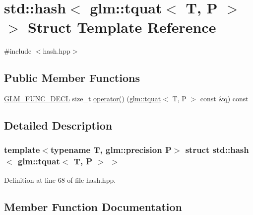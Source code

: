 \hypertarget{structstd_1_1hash_3_01glm_1_1tquat_3_01_t_00_01_p_01_4_01_4}{}\section{std\+::hash$<$ glm\+::tquat$<$ T, P $>$ $>$ Struct Template Reference}
\label{structstd_1_1hash_3_01glm_1_1tquat_3_01_t_00_01_p_01_4_01_4}


{\ttfamily \#include $<$hash.\+hpp$>$}

\subsection*{Public Member Functions}
\begin{DoxyCompactItemize}
\item 
\mbox{\hyperlink{setup_8hpp_ab2d052de21a70539923e9bcbf6e83a51}{G\+L\+M\+\_\+\+F\+U\+N\+C\+\_\+\+D\+E\+CL}} size\+\_\+t \mbox{\hyperlink{structstd_1_1hash_3_01glm_1_1tquat_3_01_t_00_01_p_01_4_01_4_a0a100f21a2aa8516ecff4f4576f7ebab}{operator()}} (\mbox{\hyperlink{structglm_1_1tquat}{glm\+::tquat}}$<$ T, P $>$ const \&\mbox{\hyperlink{glad_8h_a514729309336df22bcc8eda979d6ced4}{q}}) const
\end{DoxyCompactItemize}


\subsection{Detailed Description}
\subsubsection*{template$<$typename T, glm\+::precision P$>$\newline
struct std\+::hash$<$ glm\+::tquat$<$ T, P $>$ $>$}



Definition at line 68 of file hash.\+hpp.



\subsection{Member Function Documentation}
\mbox{\label{structstd_1_1hash_3_01glm_1_1tquat_3_01_t_00_01_p_01_4_01_4_a0a100f21a2aa8516ecff4f4576f7ebab}} 
